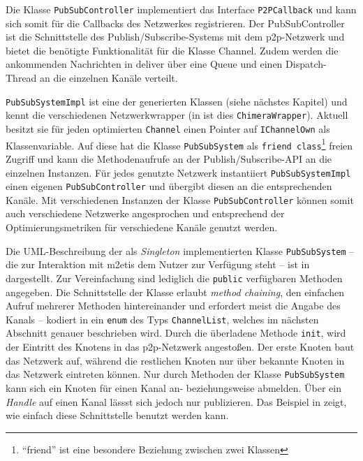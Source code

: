 

Die Klasse \texttt{PubSubController} implementiert das Interface \texttt{P2PCallback} und kann sich somit für die Callbacks des Netzwerkes registrieren. Der PubSubController ist die Schnittstelle des Publish/Subscribe-Systems mit dem \ac{p2p}-Netzwerk und bietet die benötigte Funktionalität für die Klasse Channel. Zudem werden die ankommenden Nachrichten in deliver über eine Queue und einen Dispatch-Thread an die einzelnen Kanäle verteilt. 

\texttt{PubSubSystemImpl} ist eine der generierten Klassen (siehe nächstes Kapitel) und kennt die verschiedenen Netzwerkwrapper (in  ist dies \texttt{ChimeraWrapper}). Aktuell besitzt sie für jeden optimierten \texttt{Channel} einen Pointer auf \texttt{IChannelOwn} als Klassenvariable. Auf diese hat die Klasse \texttt{PubSubSystem} als \texttt{friend class}\footnote{\enquote{friend} ist eine besondere Beziehung zwischen zwei Klassen} freien Zugriff und kann die Methodenaufrufe an der Publish/Subscribe-API an die einzelnen Instanzen. Für jedes genutzte Netzwerk instantiiert \texttt{PubSubSystemImpl} einen eigenen \texttt{PubSubController} und übergibt diesen an die entsprechenden Kanäle. Mit verschiedenen Instanzen der Klasse \texttt{PubSubController} können somit auch verschiedene Netzwerke angesprochen und entsprechend der Optimierungsmetriken für verschiedene Kanäle genutzt werden.

Die UML-Beschreibung der als \emph{Singleton} implementierten Klasse \texttt{PubSubSystem} -- die zur Interaktion mit \ac{m2etis} dem Nutzer zur Verfügung steht -- ist in  dargestellt. Zur Vereinfachung sind lediglich die \texttt{public} verfügbaren Methoden angegeben. Die Schnittstelle der Klasse erlaubt \emph{method chaining}, den einfachen Aufruf mehrerer Methoden hintereinander und erfordert meist die Angabe des Kanals -- kodiert in ein \texttt{enum} des Typs \texttt{ChannelList}, welches im nächsten Abschnitt genauer beschrieben wird.  Durch die überladene Methode \texttt{init}, wird der Eintritt des Knotens in das \ac{p2p}-Netzwerk angestoßen. Der erste Knoten baut das Netzwerk auf, während die restlichen Knoten nur über bekannte Knoten in das Netzwerk eintreten können. Nur durch Methoden der Klasse \texttt{PubSubSystem} kann sich ein Knoten für einen Kanal an- beziehungsweise abmelden. Über ein \emph{Handle} auf einen Kanal lässst sich jedoch nur publizieren. Das Beispiel in  zeigt, wie einfach diese Schnittstelle benutzt werden kann.

